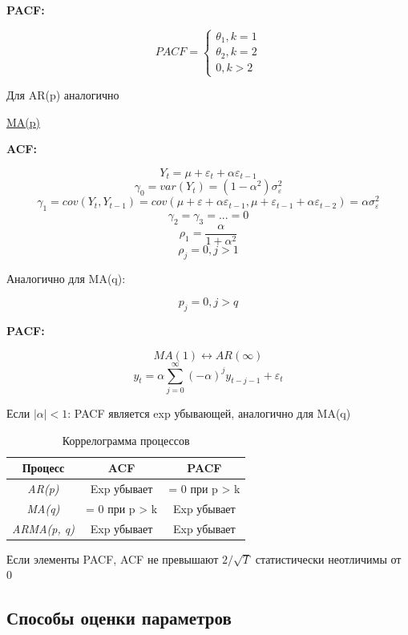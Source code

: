 \documentclass[a4paper, 12pt]{article}
\begin{document}
\textbf{PACF:}

\[PACF = \begin{cases}
    \theta_{1}, k = 1 \\
    \theta_{2}, k = 2 \\
    0, k > 2
\end{cases}\]

Для AR(p) аналогично

\begin{center}
    \underline{MA(p)}
\end{center}

\textbf{ACF:}

\[Y_{t} = \mu + \varepsilon_{t} + \alpha \varepsilon_{t - 1}\]
\[\gamma_{0} = var(Y_{t}) = (1 - \alpha^{2})\sigma_{\varepsilon}^{2}\]
\[\gamma_{1} = cov(Y_{t}, Y_{t-1}) = cov(\mu + \varepsilon + \alpha \varepsilon_{t - 1}, \mu + \varepsilon_{t - 1} + \alpha \varepsilon_{t - 2}) = \alpha \sigma_{\varepsilon}^{2}\]
\[\gamma_{2} = \gamma_{3} = ... = 0\]
\[\rho_{1} = \frac{\alpha}{1 + \alpha^{2}}\]
\[\rho_{j} = 0, j > 1\]

Аналогично для MA(q):

\[p_{j} = 0, j > q\]

\textbf{PACF:}

\[MA(1) \leftrightarrow AR(\infty)\]
\[y_{t} = \alpha\sum_{j = 0}^{\infty}(-\alpha)^{j}y_{t - j - 1} + \varepsilon_{t}\]

Если $|\alpha| < 1$: PACF является exp убывающей, аналогично для MA(q)

\begin{table}[h]
    \centering
    \begin{tabular}{|c|c|c|}
        \hline
        \textbf{Процесс} & \textbf{ACF} & \textbf{PACF} \\
        \hline
        \textit{AR(p)} & Exp убывает & = 0 при p > k \\
        \hline
        \textit{MA(q)} & = 0 при p > k & Exp убывает \\
        \hline
        \textit{ARMA(p, q)} & Exp убывает & Exp убывает \\
        \hline
    \end{tabular}
    \caption{Коррелограмма процессов}
    \label{Коррелограмма процессов}
\end{table}

Если элементы PACF, ACF не превышают $2/\sqrt{T}$ статистически неотличимы от 0

\subsection{Способы оценки параметров}
\end{document}
